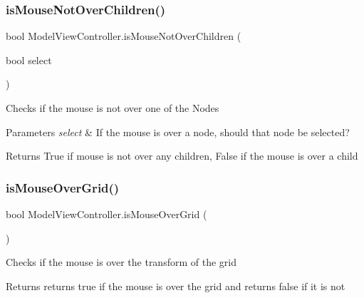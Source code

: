 \subsubsection{\texorpdfstring{is\+Mouse\+Not\+Over\+Children()}{isMouseNotOverChildren()}}
{\footnotesize\ttfamily bool Model\+View\+Controller.\+is\+Mouse\+Not\+Over\+Children (\begin{DoxyParamCaption}\item[{bool}]{select }\end{DoxyParamCaption})}



Checks if the mouse is not over one of the Nodes 


\begin{DoxyParams}{Parameters}
{\em select} & If the mouse is over a node, should that node be selected? \\
\hline
\end{DoxyParams}
\begin{DoxyReturn}{Returns}
True if mouse is not over any children, False if the mouse is over a child 
\end{DoxyReturn}
\mbox{\label{class_model_view_controller_a9eba81ca552ecca21b7d58e66b12b952}} 
\subsubsection{\texorpdfstring{is\+Mouse\+Over\+Grid()}{isMouseOverGrid()}}
{\footnotesize\ttfamily bool Model\+View\+Controller.\+is\+Mouse\+Over\+Grid (\begin{DoxyParamCaption}{ }\end{DoxyParamCaption})}



Checks if the mouse is over the transform of the grid 

\begin{DoxyReturn}{Returns}
returns true if the mouse is over the grid and returns false if it is not
\end{DoxyReturn}
\mbox{\label{class_model_view_controller_a0131bdf2b008298e97229e2c729015d4}} 
